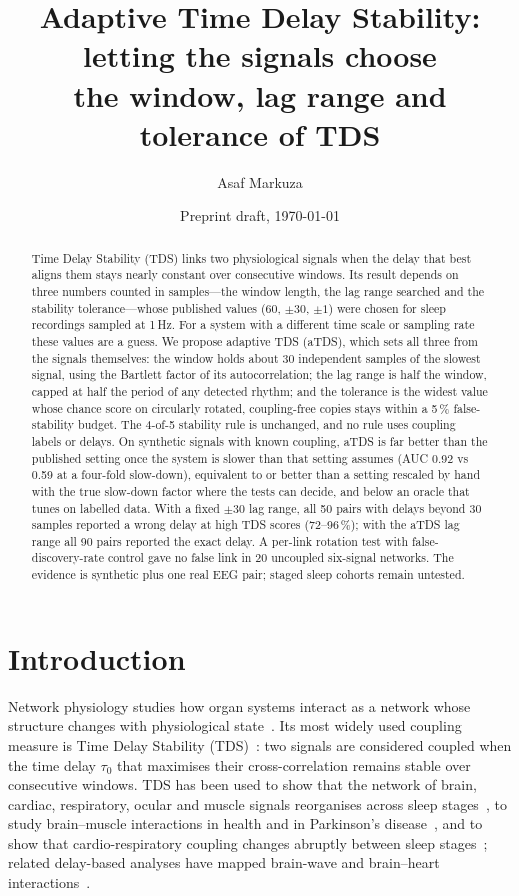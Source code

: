 \documentclass[11pt,a4paper]{article}
\title{Adaptive Time Delay Stability: letting the signals choose\\the window, lag range and tolerance of TDS}
\author{Asaf Markuza}
\date{Preprint draft, \today}
\begin{document}
\maketitle

\begin{abstract}
Time Delay Stability (TDS) links two physiological signals when the delay that best aligns them stays nearly constant over consecutive windows. Its result depends on three numbers counted in samples---the window length, the lag range searched and the stability tolerance---whose published values (60, $\pm30$, $\pm1$) were chosen for sleep recordings sampled at 1\,Hz. For a system with a different time scale or sampling rate these values are a guess. We propose adaptive TDS (aTDS), which sets all three from the signals themselves: the window holds about 30 independent samples of the slowest signal, using the Bartlett factor of its autocorrelation; the lag range is half the window, capped at half the period of any detected rhythm; and the tolerance is the widest value whose chance score on circularly rotated, coupling-free copies stays within a 5\,\% false-stability budget. The 4-of-5 stability rule is unchanged, and no rule uses coupling labels or delays. On synthetic signals with known coupling, aTDS is far better than the published setting once the system is slower than that setting assumes (AUC 0.92 vs 0.59 at a four-fold slow-down), equivalent to or better than a setting rescaled by hand with the true slow-down factor where the tests can decide, and below an oracle that tunes on labelled data. With a fixed $\pm30$ lag range, all 50 pairs with delays beyond 30 samples reported a wrong delay at high TDS scores (72--96\,\%); with the aTDS lag range all 90 pairs reported the exact delay. A per-link rotation test with false-discovery-rate control gave no false link in 20 uncoupled six-signal networks. The evidence is synthetic plus one real EEG pair; staged sleep cohorts remain untested.
\end{abstract}

\section{Introduction}
\label{sec:intro}

Network physiology studies how organ systems interact as a network whose structure changes with physiological state~\cite{bashan2012network,bartsch2015network,ivanov2016focus,ivanov2021new}. Its most widely used coupling measure is Time Delay Stability (TDS)~\cite{bashan2012network}: two signals are considered coupled when the time delay $\tau_0$ that maximises their cross-correlation remains stable over consecutive windows. TDS has been used to show that the network of brain, cardiac, respiratory, ocular and muscle signals reorganises across sleep stages~\cite{bashan2012network,bartsch2015network}, to study brain--muscle interactions in health and in Parkinson's disease~\cite{rizzo2020network,rizzo2023dynamic}, and to show that cardio-respiratory coupling changes abruptly between sleep stages~\cite{bartsch2012phase}; related delay-based analyses have mapped brain-wave and brain--heart interactions~\cite{liu2015plasticity,lin2016delay}.
\end{document}
